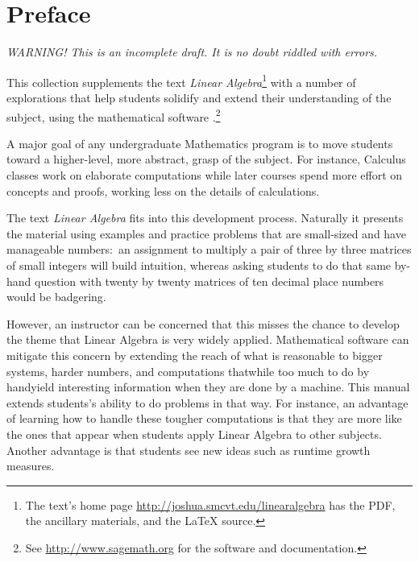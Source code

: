 \chapter*{Preface}\pagestyle{preface}\thispagestyle{preface}

\textit{WARNING! This is an incomplete draft.
It is no doubt riddled with errors.}
\medskip

This collection supplements the text \nocite{Hefferon12}
\textit{Linear Algebra}\footnote{The text's home page 
\protect\url{http://joshua.smcvt.edu/linearalgebra} 
has the PDF, the ancillary materials, and the \protect\LaTeX{} source.}
with a number of explorations that help students
solidify and extend their understanding of the subject, 
using the mathematical software \Sage{}.\footnote{See 
\url{http://www.sagemath.org} for the software and documentation.}

A major goal of any undergraduate Mathematics program is to move students 
toward a higher-level, more abstract, grasp of the subject.
For instance, Calculus classes work on elaborate computations
while later courses spend more effort on concepts and proofs, working
less on the details of calculations.  

The text \textit{Linear Algebra} fits into
this development process.
Naturally it presents the material 
using examples and practice problems
that are small-sized and have manageable numbers:~an 
assignment to multiply a pair of three by three matrices
of small integers will build intuition, whereas asking students to do that same 
by-hand question with twenty by twenty matrices
of ten decimal place numbers would be badgering. 

However, an instructor can be concerned that this misses the chance 
to develop the theme that Linear Algebra is very widely applied. 
Mathematical software can mitigate this concern by extending the reach of
what is reasonable 
to bigger systems, harder numbers, and computations 
that\Dash while too much to do by hand\Dash yield
interesting information when they are done by a machine.
This manual extends students's ability to do problems in that way.
For instance, an advantage of learning how to handle these 
tougher computations is that 
they are more like the ones that appear when students apply Linear 
Algebra to other subjects.
Another advantage is that students see new ideas such as 
runtime growth measures.


